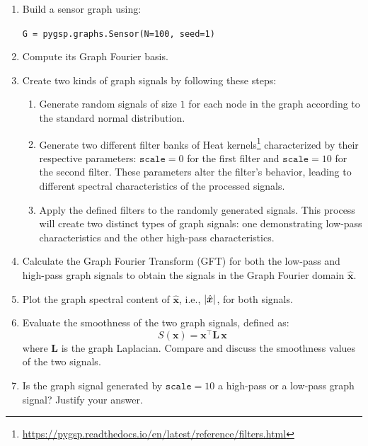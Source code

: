 \documentclass{article}
\DeclarePairedDelimiter\abs{\lvert}{\rvert}
\begin{document}
\begin{enumerate}[leftmargin=1.5em]
    \item Build a sensor graph using:
    \begin{center}
        \texttt{G = pygsp.graphs.Sensor(N=100, seed=1)}
    \end{center}

    \item Compute its Graph Fourier basis.

    \item Create two kinds of graph signals by following these steps:
    \begin{enumerate}[leftmargin=1.5em]
        \item Generate random signals of size $1$ for each node in the graph according to the standard normal distribution.
        \item Generate two different filter banks of Heat kernels\footnote{\url{https://pygsp.readthedocs.io/en/latest/reference/filters.html}} characterized by their respective parameters: $\mathtt{scale} = 0$ for the first filter and $\mathtt{scale} = 10$ for the second filter. These parameters alter the filter's behavior, leading to different spectral characteristics of the processed signals.
        \item Apply the defined filters to the randomly generated signals. This process will create two distinct types of graph signals: one demonstrating low-pass characteristics and the other high-pass characteristics.
    \end{enumerate}

    \item Calculate the Graph Fourier Transform (GFT) for both the low-pass and high-pass graph signals to obtain the signals in the Graph Fourier domain $\hat{\bm{x}}$.

    \item Plot the graph spectral content of $\hat{\bm{x}}$, i.e., $\abs{\hat{\bm{x}}}$, for both signals.

    \item Evaluate the smoothness of the two graph signals, defined as:
    \[
        S(\bm{x}) = \bm{x}^\top \mathbf{L}\, \bm{x}
    \]
    where $\mathbf{L}$ is the graph Laplacian. Compare and discuss the smoothness values of the two signals.

    \item Is the graph signal generated by $\mathtt{scale}=10$ a high-pass or a low-pass graph signal? Justify your answer.
\end{enumerate}
\end{document}
